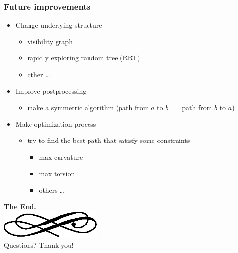 \begin{frame}
  \frametitle{Future improvements}
  \begin{itemize}
  \item Change underlying \alert{structure}\pause
    \begin{itemize}
    \item visibility graph\pause
    \item rapidly exploring random tree (RRT)\pause
    \item other \dots\pause
    \end{itemize}
  \item Improve \alert{postprocessing}\pause
    \begin{itemize}
    \item make a \alert{symmetric} algorithm (path from $a$ to $b$ $=$ path
      from $b$ to $a$)\pause
    \end{itemize}
  \item Make \alert{optimization} process\pause
    \begin{itemize}
    \item try to find the best path that satisfy some constraints\pause
      \begin{itemize}
      \item max \alert{curvature}\pause
      \item max \alert{torsion}\pause
      \item others \dots
      \end{itemize}
    \end{itemize}
  \end{itemize}
\end{frame}

\begin{frame}
  \begin{center}
	\textbf{\calligra\Huge The End.}\\
  \includegraphics[width=5cm]{img/ornament.eps}\\[1cm]
	\pause
	{\huge\calligra Questions?\pause{} Thank you!}
  \end{center}
\end{frame}


